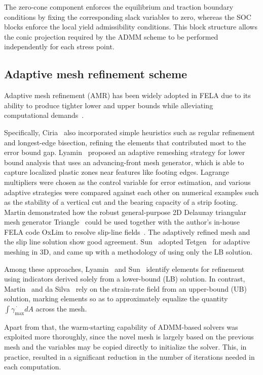 The zero-cone component enforces the equilibrium and traction boundary conditions by fixing the corresponding slack variables to zero, whereas the SOC blocks enforce the local yield admissibility conditions. This block structure allows the conic projection required by the ADMM scheme to be performed independently for each stress point.


\subsection{Adaptive mesh refinement scheme}

Adaptive mesh refinement (AMR) has been widely adopted in FELA due to its ability to produce tighter lower and upper bounds while alleviating computational demands~\cite{adaptive_mesh_Christiansen, adaptive_mesh_Lyamin, adaptive_mesh_ciria, LBAdaptive, Martin_2011, 3DHB}. 

Specifically, Ciria~\cite{adaptive_mesh_ciria} also incorporated simple heuristics such as regular refinement and longest-edge bisection, refining the elements that contributed most to the error bound gap. Lyamin~\cite{adaptive_mesh_Lyamin} proposed an adaptive remeshing strategy for lower bound analysis that uses an advancing-front mesh generator, which is able to capture localized plastic zones near features like footing edges. Lagrange multipliers were chosen as the control variable for error estimation, and various adaptive strategies were compared against each other on numerical examples such as the stability of a vertical cut and the bearing capacity of a strip footing. Martin demonstrated how the robust general-purpose 2D Delaunay triangular mesh generator Triangle~\cite{Triangle} could be used together with the author's in-house FELA code OxLim to resolve slip-line fields~\cite{Martin_2011}. The adaptively refined mesh and the slip line solution show good agreement. Sun~\cite{LBAdaptive} adopted Tetgen~\cite{TetGen} for adaptive meshing in 3D, and came up with a methodology of using only the LB solution. 

Among these approaches, Lyamin~\cite{adaptive_mesh_Lyamin} and Sun~\cite{LBAdaptive} identify elements for refinement using indicators derived solely from a lower-bound (LB) solution. In contrast, Martin~\cite{Martin_2011} and da Silva~\cite{3DHB} rely on the strain-rate field from an upper-bound (UB) solution, marking elements so as to approximately equalize the quantity $\int \dot{\gamma_\text{max}} dA$ across the mesh.

Apart from that, the warm-starting capability of ADMM-based solvers was exploited more thoroughly, since the novel mesh is largely based on the previous mesh and the variables may be copied directly to initialize the solver. This, in practice, resulted in a significant reduction in the number of iterations needed in each computation.

